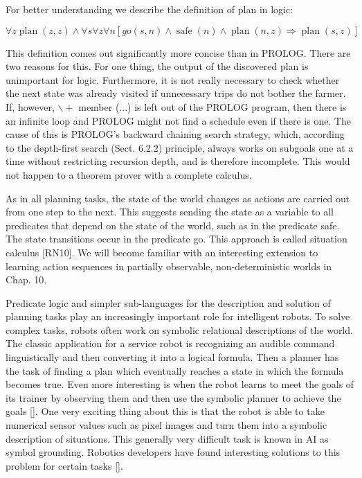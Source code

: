 \documentclass[10pt]{book}
\begin{document}
For better understanding we describe the definition of plan in logic:

$$
\forall z \operatorname{plan}(z, z) \wedge \forall s \forall z \forall n[g o(s, n) \wedge \operatorname{safe}(n) \wedge \operatorname{plan}(n, z) \Rightarrow \operatorname{plan}(s, z)]
$$

This definition comes out significantly more concise than in PROLOG. There are two reasons for this. For one thing, the output of the discovered plan is unimportant for logic. Furthermore, it is not really necessary to check whether the next state was already visited if unnecessary trips do not bother the farmer. If, however, $\backslash+$ member (...) is left out of the PROLOG program, then there is an infinite loop and PROLOG might not find a schedule even if there is one. The cause of this is PROLOG's backward chaining search strategy, which, according to the depth-first search (Sect. 6.2.2) principle, always works on subgoals one at a time without restricting recursion depth, and is therefore incomplete. This would not happen to a theorem prover with a complete calculus.

As in all planning tasks, the state of the world changes as actions are carried out from one step to the next. This suggests sending the state as a variable to all predicates that depend on the state of the world, such as in the predicate safe. The state transitions occur in the predicate go. This approach is called situation calculus [RN10]. We will become familiar with an interesting extension to learning action sequences in partially observable, non-deterministic worlds in Chap. 10.

Predicate logic and simpler sub-languages for the description and solution of planning tasks play an increasingly important role for intelligent robots. To solve complex tasks, robots often work on symbolic relational descriptions of the world. The classic application for a service robot is recognizing an audible command linguistically and then converting it into a logical formula. Then a planner has the task of finding a plan which eventually reaches a state in which the formula becomes true. Even more interesting is when the robot learns to meet the goals of its trainer by observing them and then use the symbolic planner to achieve the goals [\cite{cep15b}]. One very exciting thing about this is that the robot is able to take numerical sensor values such as pixel images and turn them into a symbolic description of situations. This generally very difficult task is known in AI as symbol grounding. Robotics developers have found interesting solutions to this problem for certain tasks [\cite{cep15a}].
\end{document}
